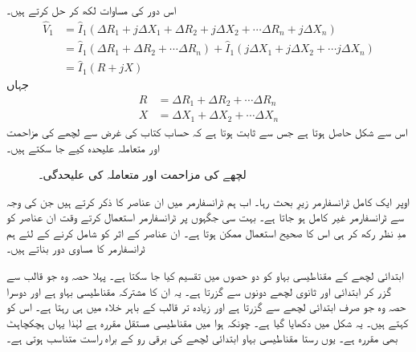 اس دور کی مساوات لکھ کر حل کرتے ہیں۔
\begin{align*}
\hat{V}_1&=\hat{I}_1 \left(\Delta R_1 + j \Delta X_1 +\Delta R_2 + j \Delta X_2 + \cdots \Delta R_n + j \Delta X_n   \right)\\
&=\hat{I}_1 \left(\Delta R_1 +\Delta R_2 +\cdots \Delta R_n   \right)+\hat{I}_1 \left(j \Delta X_1 + j \Delta X_2+\cdots   j \Delta X_n   \right)\\
&=\hat{I}_1 \left( R +j X \right)
\end{align*}
جہاں
\begin{align*}
R&=\Delta R_1 +\Delta R_2 +\cdots \Delta R_n\\
X&=\Delta X_1 + \Delta X_2 +\cdots   \Delta X_n
\end{align*}
اس سے  شکل   حاصل ہوتا ہے  جس سے  ثابت ہوتا ہے کہ حساب کتاب کی غرض سے لچھے کی مزاحمت اور متعاملہ علیحدہ کیے جا سکتے ہیں۔
\begin{figure}
\centering
\caption{لچھے کی مزاحمت اور متعاملہ کی علیحدگی۔}
\label{شکل_ٹرانسفارمر_لچھے_کی_مزاحمت_اور_متعاملہ_کی_علیحدگی}
\end{figure}
%
اوپر ایک کامل ٹرانسفارمر زیرِ بحث رہا۔ اب ہم ٹرانسفارمر میں ان عناصر کا ذکر کرتے ہیں جن کی وجہ سے ٹرانسفارمر غیر کامل ہو جاتا ہے۔ بہت سی جگہوں پر ٹرانسفارمر استعمال کرتے وقت ان عناصر کو مدِ نظر رکھ کر ہی اس کا صحیح استعمال ممکن ہوتا ہے۔ ان عناصر کے اثر کو شامل کرنے کے لئے ہم  ٹرانسفارمر کا مساوی دور بناتے ہیں۔

ابتدائی لچھے کے مقناطیسی بہاو کو دو حصوں میں تقسیم کیا جا سکتا ہے۔ پہلا حصہ وہ جو قالب سے گزر کر ابتدائی اور ثانوی لچھے دونوں سے گزرتا ہے۔ یہ ان کا مشترکہ مقناطیسی بہاو ہے اور دوسرا حصہ وہ جو صرف ابتدائی لچھے سے گزرتا ہے اور زیادہ تر قالب کے باہر خلاء میں ہی رہتا ہے۔  اس کو    کہتے ہیں۔ یہ شکل میں دکھایا گیا ہے۔ چونکہ ہوا میں مقناطیسی مستقل  مقررہ ہے لہٰذا یہاں ہچکچاہٹ بھی مقررہ ہے۔  یوں رستا مقناطیسی بہاو ابتدائی لچھے کی برقی رو کے  براہ راست متناسب ہوتی ہے۔


